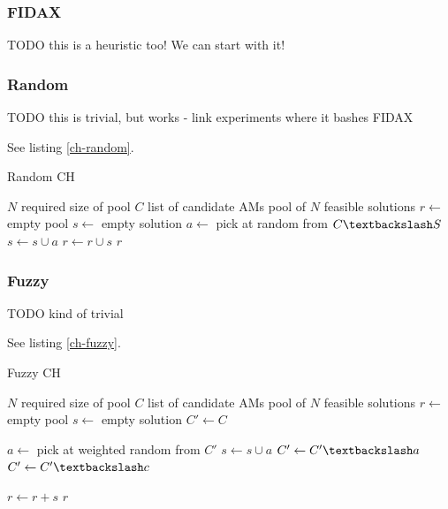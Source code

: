\documentclass[a4paper,12pt,oneside]{report}
\begin{document}
\subsubsection{FIDAX}

TODO this is a heuristic too! We can start with it!

\subsubsection{Random}

TODO this is trivial, but works - link experiments where it bashes FIDAX

See listing \ref{ch-random}.

\begin{algorithm}
\caption{Random CH}
\label{ch-random}
\begin{algorithmic}
\REQUIRE $N$ required size of pool
\REQUIRE $C$ list of candidate AMs
\ENSURE pool of $N$ feasible solutions
\STATE $r \gets $ empty pool
\STATE {}
\STATE $s \gets $ empty solution
\STATE $a \gets $ pick at random from $C \textbackslash S$
\STATE $s \gets s \cup a$
\ENDWHILE
\STATE $r \gets r \cup s$
\ENDFOR
\RETURN $r$
\end{algorithmic}
\end{algorithm}

\subsubsection{Fuzzy}

TODO kind of trivial

See listing \ref{ch-fuzzy}.

\begin{algorithm}
\caption{Fuzzy CH}
\label{ch-fuzzy}
\begin{algorithmic}
\REQUIRE $N$ required size of pool
\REQUIRE $C$ list of candidate AMs
\ENSURE pool of $N$ feasible solutions
\STATE $r \gets $ empty pool
\STATE {}
\STATE $s \gets $ empty solution
\STATE $C' \gets C$

\STATE $a \gets $ pick at weighted random from $C'$
\STATE $s \gets s \cup a$
\STATE $C' \gets C' \textbackslash a$
\ENDIF
{}
\STATE {}
\STATE $C' \gets C' \textbackslash c$
\ENDIF
\ENDFOR
\ENDWHILE

\STATE $r \gets r + s$
\ENDFOR
\RETURN $r$
\end{algorithmic}
\end{algorithm}
\end{document}
